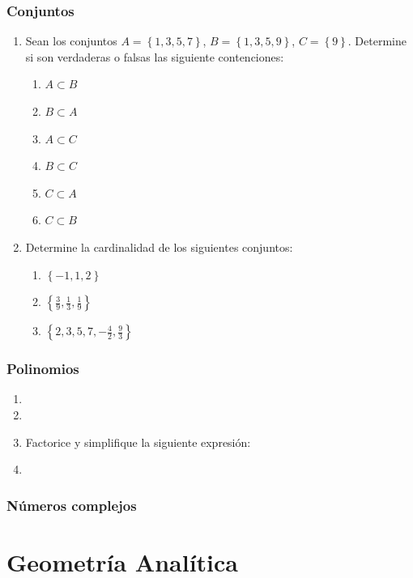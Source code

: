 \documentclass[11pt, twoside]{book}
\newcommand{\set}[1]{\left\lbrace #1 \right\rbrace}
\begin{document}
\subsection*{Conjuntos}
\begin{enumerate}
    \item Sean los conjuntos \(A=\set{1,3,5,7}\), \(B=\set{1,3,5,9}\), \(C=\set{9}\).
        Determine si son verdaderas o falsas las siguiente contenciones:
        \begin{multicols}{2}
        \begin{enumerate}[label=\alph*)]
            \item \(A\subset B\)
            \item \(B\subset A\)
            \item \(A\subset C\)
            \item \(B\subset C\)
            \item \(C\subset A\)
            \item \(C\subset B\)
        \end{enumerate}
        \end{multicols}
    \item Determine la cardinalidad de los siguientes conjuntos:
        \begin{enumerate}[label=\alph*)]
            \item \(\set{-1, 1,2}\)
            \item \(\set{\frac39,\frac13,\frac19}\)
            \item \(\set{2,3,5,7,-\frac42,\frac93}\)
        \end{enumerate}
\end{enumerate}
\subsection*{Polinomios}
\begin{enumerate}
    \item 
    \item
    \item Factorice y simplifique la siguiente expresión:
    \item 
\end{enumerate}
\subsection*{Números complejos}


\chapter{Geometría Analítica}
\end{document}
